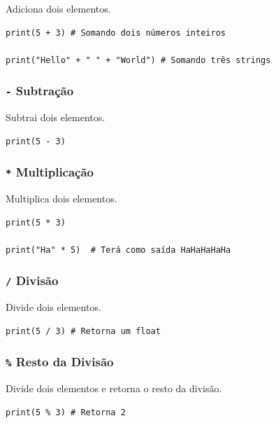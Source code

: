 \documentclass[]{book}
\begin{document}
Adiciona dois elementos.

\begin{verbatim}
print(5 + 3) # Somando dois números inteiros

print("Hello" + " " + "World") # Somando três strings
\end{verbatim}

\subsubsection{\texorpdfstring{\texttt{-}
Subtração}{- Subtração}}\label{subtracao}

Subtrai dois elementos.

\begin{verbatim}
print(5 - 3)
\end{verbatim}

\subsubsection{\texorpdfstring{\texttt{*}
Multiplicação}{* Multiplicação}}\label{multiplicacao}

Multiplica dois elementos.

\begin{verbatim}
print(5 * 3)

print("Ha" * 5)  # Terá como saída HaHaHaHaHa
\end{verbatim}

\subsubsection{\texorpdfstring{\texttt{/}
Divisão}{/ Divisão}}\label{divisao}

Divide dois elementos.

\begin{verbatim}
print(5 / 3) # Retorna um float
\end{verbatim}

\subsubsection{\texorpdfstring{\texttt{\%} Resto da
Divisão}{\% Resto da Divisão}}\label{resto-da-divisao}

Divide dois elementos e retorna o resto da divisão.

\begin{verbatim}
print(5 % 3) # Retorna 2
\end{verbatim}
\end{document}
